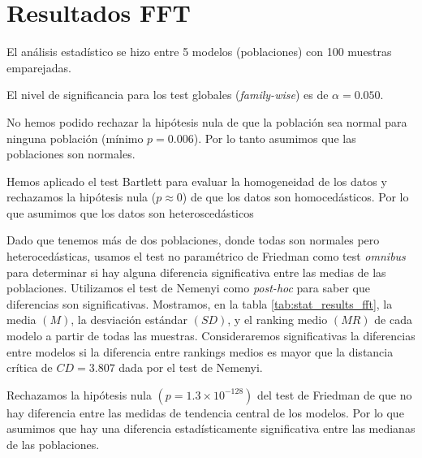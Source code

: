 \documentclass[a4paper,oneside,11pt,leqno]{article}
\begin{document}
	\section{Resultados FFT}
	\label{sec:results_fft}

	El análisis estadístico se hizo entre 5 modelos (poblaciones) con 100 muestras emparejadas.

	El nivel de significancia para los test globales (\textit{family-wise}) es de $\alpha=0.050$.

	No hemos podido rechazar la hipótesis nula de que la población sea normal para ninguna población (mínimo $p=0.006$). Por lo tanto asumimos que las poblaciones son normales.

	Hemos aplicado el test Bartlett para evaluar la homogeneidad de los datos y rechazamos la hipótesis nula ($p\approx 0$) de que los datos son homocedásticos. Por lo que asumimos que los datos son heteroscedásticos

	Dado que tenemos más de dos poblaciones, donde todas son normales pero heterocedásticas, usamos el test no paramétrico de Friedman como test \textit{omnibus} para determinar si hay alguna diferencia significativa entre las medias de las poblaciones. Utilizamos el test de Nemenyi como \textit{post-hoc} para saber que diferencias son significativas. Mostramos, en la tabla \ref{tab:stat_results_fft}, la media $(M)$, la desviación estándar $(SD)$, y el ranking medio $(MR)$ de cada modelo a partir de todas las muestras. Consideraremos significativas la diferencias entre modelos si la diferencia entre rankings medios es mayor que la distancia crítica de $CD=3.807$ dada por el test de Nemenyi.

	Rechazamos la hipótesis nula $(p=1.3\times 10^{-128})$ del test de Friedman de que no hay diferencia entre las medidas de tendencia central de los modelos. Por lo que asumimos que hay una diferencia estadísticamente significativa entre las medianas de las poblaciones.
\end{document}
